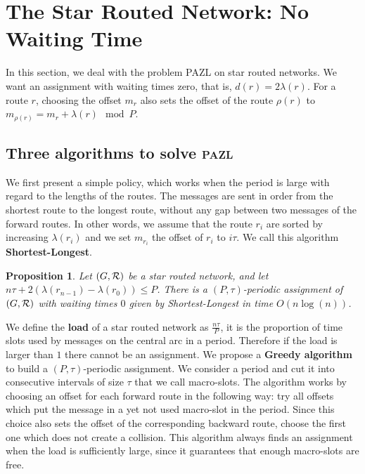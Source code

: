 \documentclass[a4paper,10pt]{IEEEtran}
\newtheorem{proposition}{Proposition}
\newcommand\pazl{\textsc{pazl}\xspace}
\begin{document}
\section{The Star Routed Network: No Waiting Time} \label{sec:PAZL}
  
  
     In this section, we deal with the problem PAZL on star routed networks. We want an assignment with waiting times zero, that is, $d(r) = 2\lambda(r)$. For a route $r$, choosing the offset $m_r$ also sets the offset of the route $\rho(r)$ to $m_{\rho(r)} = m_{r} + \lambda(r) \mod P$.

    \subsection{Three algorithms to solve \pazl}

    We first present a simple policy, which works when the period is large with regard to the lengths of the routes.
    The messages are sent in order from the shortest route to the longest route, without any gap between two messages of the forward routes.
    In other words, we assume that the route $r_i$ are sorted by increasing $\lambda(r_i)$ and we set $m_{r_i}$ the offset of $r_i$ to $i\tau$. We call this algorithm {\bf Shortest-Longest}.
    
      \begin{proposition} Let $(G, {\cal R})$ be a star routed network, and let $n\tau + 2(\lambda(r_{n-1}) - \lambda(r_{0})) \leq P$. There is a $(P,\tau)$-periodic assignment of $(G, {\cal R})$ with waiting times $0$ given by Shortest-Longest in time $O(n\log(n))$.\label{prop:SL}
      \end{proposition}

      

      We define the \textbf{load} of a star routed network as $\frac{n\tau}{P}$, it is the proportion of time slots used by messages on the central arc in a period. Therefore if the load is larger than $1$ there cannot be an assignment. We propose a \textbf{Greedy algorithm} to build a $(P,\tau)$-periodic assignment. We consider a period and cut it into consecutive intervals of size $\tau$ that we call macro-slots. The algorithm works by choosing an offset for each forward route in the following way: try all offsets which put the message in a yet not used macro-slot in the period. Since this choice also sets the offset of the corresponding backward route, choose the first one which does not create a collision. This algorithm always finds an assignment when the load is sufficiently large, since it guarantees that enough macro-slots are free.
      
\end{document}
